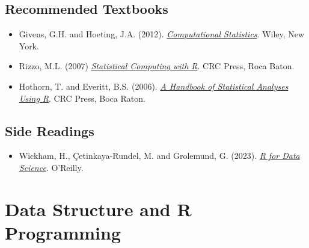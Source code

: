 \documentclass[
  letterpaper,
  DIV=11,
  numbers=noendperiod]{scrreprt}
\providecommand{\tightlist}{%
  \setlength{\itemsep}{0pt}\setlength{\parskip}{0pt}}
\begin{document}
\section*{Recommended Textbooks}\label{recommended-textbooks}


\begin{itemize}
\item
  Givens, G.H. and Hoeting, J.A. (2012).
  \href{https://www.stat.colostate.edu/computationalstatistics/}{\emph{Computational
  Statistics}}. Wiley, New York.
\item
  Rizzo, M.L. (2007)
  \href{https://a-roshani.ir/files/SC/\%5B4\%5D\%20\%5BMaria\%20L.\%20Rizzo\%5D\%5B2019\%5D\%20Statistical\%20Computing\%20\%20with\%20R,\%20Second\%20Edition.pdf}{\emph{Statistical
  Computing with R}}. CRC Press, Roca Baton.
\item
  Hothorn, T. and Everitt, B.S. (2006).
  \href{https://digitallibrary.tsu.ge/book/2019/september/books/A-Handbook-of-Statistical-Analyses.pdf}{\emph{A
  Handbook of Statistical Analyses Using R}}. CRC Press, Boca Raton.
\end{itemize}

\section*{Side Readings}\label{side-readings}


\begin{itemize}
\tightlist
\item
  Wickham, H., Çetinkaya-Rundel, M. and Grolemund, G. (2023).
  \href{https://r4ds.hadley.nz/}{\emph{R for Data Science}}. O'Reilly.
\end{itemize}


\chapter{Data Structure and R
Programming}\label{data-structure-and-r-programming}

\newcommand{\E}{\mathbb{E}}
\newcommand{\R}{\mathbb{R}}
\newcommand{\var}{\mathbb{V}ar}
\newcommand{\cov}{\mathbb{C}ov}
\newcommand{\corr}{\mathbb{C}orr}
\newcommand{\unif}{\operatorname{Unif}}
\newcommand{\geom}{\operatorname{Geom}}
\newcommand{\bet}{\operatorname{Beta}}
\newcommand{\bern}{\operatorname{Bern}}
\newcommand{\iid}{\overset{iid}{\sim}}
\newcommand{\ef}{\operatorname{Eff}}
\newcommand{\htt}{\hat{\theta}}
\end{document}
